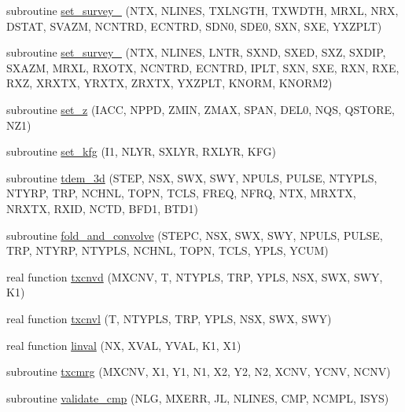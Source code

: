 \begin{DoxyCompactItemize}
\item 
subroutine \hyperlink{Leroi__c_8f90_ac15d94df59fcf9ff238738e88ec7ada0}{set\+\_\+survey\+\_} (N\+TX, N\+L\+I\+N\+ES, T\+X\+L\+N\+G\+TH, T\+X\+W\+D\+TH, M\+R\+XL, N\+RX, D\+S\+T\+AT, S\+V\+A\+ZM, N\+C\+N\+T\+RD, E\+C\+N\+T\+RD, S\+D\+N0, S\+D\+E0, S\+XN, S\+XE, Y\+X\+Z\+P\+LT)
\item 
subroutine \hyperlink{Leroi__c_8f90_a0fbc525b8664d780f1158e1061046731}{set\+\_\+survey\+\_} (N\+TX, N\+L\+I\+N\+ES, L\+N\+TR, S\+X\+ND, S\+X\+ED, S\+XZ, S\+X\+D\+IP, S\+X\+A\+ZM, M\+R\+XL, R\+X\+O\+TX, N\+C\+N\+T\+RD, E\+C\+N\+T\+RD, I\+P\+LT, S\+XN, S\+XE, R\+XN, R\+XE, R\+XZ, X\+R\+X\+TX, Y\+R\+X\+TX, Z\+R\+X\+TX, Y\+X\+Z\+P\+LT, K\+N\+O\+RM, K\+N\+O\+R\+M2)
\item 
subroutine \hyperlink{Leroi__c_8f90_aebaab3e30630bc52f3b79ccbc924f89c}{set\+\_\+z} (I\+A\+CC, N\+P\+PD, Z\+M\+IN, Z\+M\+AX, S\+P\+AN, D\+E\+L0, N\+QS, Q\+S\+T\+O\+RE, N\+Z1)
\item 
subroutine \hyperlink{Leroi__c_8f90_a8e7ce2c7dc3e5ee45a8adefc6e6bba97}{set\+\_\+kfg} (I1, N\+L\+YR, S\+X\+L\+YR, R\+X\+L\+YR, K\+FG)
\item 
subroutine \hyperlink{Leroi__c_8f90_a9459812f7e65c931ea1310423669f22a}{tdem\+\_\+3d} (S\+T\+EP, N\+SX, S\+WX, S\+WY, N\+P\+U\+LS, P\+U\+L\+SE, N\+T\+Y\+P\+LS, N\+T\+Y\+RP, T\+RP, N\+C\+H\+NL, T\+O\+PN, T\+C\+LS, F\+R\+EQ, N\+F\+RQ, N\+TX, M\+R\+X\+TX, N\+R\+X\+TX, R\+X\+ID, N\+C\+TD, B\+F\+D1, B\+T\+D1)
\item 
subroutine \hyperlink{Leroi__c_8f90_adf5b72e5e0c8b51d6d076cc274531811}{fold\+\_\+and\+\_\+convolve} (S\+T\+E\+PC, N\+SX, S\+WX, S\+WY, N\+P\+U\+LS, P\+U\+L\+SE, T\+RP, N\+T\+Y\+RP, N\+T\+Y\+P\+LS, N\+C\+H\+NL, T\+O\+PN, T\+C\+LS, Y\+P\+LS, Y\+C\+UM)
\item 
real function \hyperlink{Leroi__c_8f90_a1cdfcb6ee629073412c28d9cf0215636}{txcnvd} (M\+X\+C\+NV, T, N\+T\+Y\+P\+LS, T\+RP, Y\+P\+LS, N\+SX, S\+WX, S\+WY, K1)
\item 
real function \hyperlink{Leroi__c_8f90_a1cb0065a1b3068676ef2beb814db93f5}{txcnvl} (T, N\+T\+Y\+P\+LS, T\+RP, Y\+P\+LS, N\+SX, S\+WX, S\+WY)
\item 
real function \hyperlink{Leroi__c_8f90_accb3ec8ce6fe855a60b0c1959fc6e2c8}{linval} (NX, X\+V\+AL, Y\+V\+AL, K1, X1)
\item 
subroutine \hyperlink{Leroi__c_8f90_a91b093a6d74ab88b54c4e2121d31ffa2}{txcmrg} (M\+X\+C\+NV, X1, Y1, N1, X2, Y2, N2, X\+C\+NV, Y\+C\+NV, N\+C\+NV)
\item 
subroutine \hyperlink{Leroi__c_8f90_aa934c3b9754a6a8e18f83b6de33a0df8}{validate\+\_\+cmp} (N\+LG, M\+X\+E\+RR, JL, N\+L\+I\+N\+ES, C\+MP, N\+C\+M\+PL, I\+S\+YS)

\end{DoxyCompactItemize}

